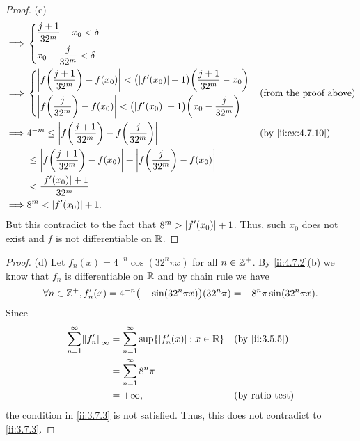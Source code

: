 \begin{proof}{(c)}
\begin{align*}
    \implies & \begin{dcases}
                 \dfrac{j + 1}{32^m} - x_0 < \delta \\
                 x_0 - \dfrac{j}{32^m} < \delta
               \end{dcases}                                                                                                              \\
    \implies & \begin{dcases}
                 \abs{f\bigg(\dfrac{j + 1}{32^m}\bigg) - f(x_0)} < \big(\abs{f'(x_0)} + 1\big) \bigg(\dfrac{j + 1}{32^m} - x_0\bigg) \\
                 \abs{f\bigg(\dfrac{j}{32^m}\bigg) - f(x_0)} < \big(\abs{f'(x_0)} + 1\big) \bigg(x_0 - \dfrac{j}{32^m}\bigg)
               \end{dcases} &  & \text{(from the proof above)}                           \\
    \implies & 4^{-m} \leq \abs{f\bigg(\dfrac{j + 1}{32^m}\bigg) - f\bigg(\dfrac{j}{32^m}\bigg)}                                        &  & \by{ii:ex:4.7.10} \\
             & \leq \abs{f\bigg(\dfrac{j + 1}{32^m}\bigg) - f(x_0)} + \abs{f\bigg(\dfrac{j}{32^m}\bigg) - f(x_0)}                                              \\
             & < \dfrac{\abs{f'(x_0)} + 1}{32^m}                                                                                                               \\
    \implies & 8^m < \abs{f'(x_0)} + 1.
  \end{align*}
  But this contradict to the fact that \(8^m > \left\lvert f'(x_0)\right\rvert + 1\).
  Thus, such \(x_0\) does not exist and \(f\) is not differentiable on \(\mathbb{R}\).
\end{proof}

\begin{proof}{(d)}
  Let \(f_n(x) = 4^{-n} \cos(32^n \pi x)\) for all \(n \in \mathbb{Z}^+\).
  By \cref{ii:4.7.2}(b) we know that \(f_n\) is differentiable on \(\mathbb{R}\) and by chain rule we have
  \[
    \forall n \in \mathbb{Z}^+, f_n'(x) = 4^{-n} \big(-\sin(32^n \pi x)\big) (32^n \pi) = - 8^n \pi \sin(32^n \pi x).
  \]
  Since
  \begin{align*}
    \sum_{n = 1}^\infty \norm*{f_n'}_\infty & = \sum_{n = 1}^\infty \sup\set{\abs{f_n'(x)} : x \in \R} &  & \by{ii:3.5.5}          \\
                                            & = \sum_{n = 1}^\infty 8^n \pi                                                        \\
                                            & = +\infty,                                               &  & \text{(by ratio test)}
  \end{align*}
  the condition in \cref{ii:3.7.3} is not satisfied.
  Thus, this does not contradict to \cref{ii:3.7.3}.
\end{proof}
